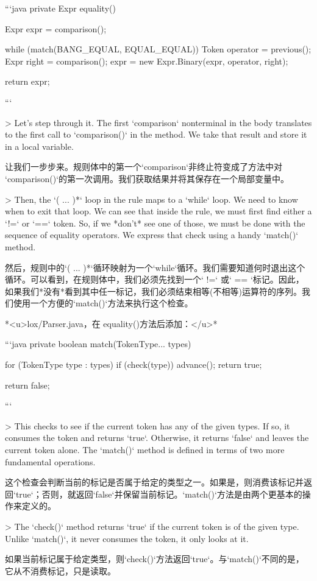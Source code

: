 \documentclass[cn,11pt,chinese]{elegantbook}
\begin{document}
```java
  private Expr equality() {
    Expr expr = comparison();

    while (match(BANG_EQUAL, EQUAL_EQUAL)) {
      Token operator = previous();
      Expr right = comparison();
      expr = new Expr.Binary(expr, operator, right);
    }

    return expr;
  }
```

> Let’s step through it. The first `comparison` nonterminal in the body translates to the first call to `comparison()` in the method. We take that result and store it in a local variable.

让我们一步步来。规则体中的第一个`comparison`非终止符变成了方法中对 `comparison()`的第一次调用。我们获取结果并将其保存在一个局部变量中。

> Then, the `( ... )*` loop in the rule maps to a `while` loop. We need to know when to exit that loop. We can see that inside the rule, we must first find either a `!=` or `==` token. So, if we *don’t* see one of those, we must be done with the sequence of equality operators. We express that check using a handy `match()` method.

然后，规则中的`( ... )*`循环映射为一个`while`循环。我们需要知道何时退出这个循环。可以看到，在规则体中，我们必须先找到一个` !=` 或` == `标记。因此，如果我们*没有*看到其中任一标记，我们必须结束相等(不相等)运算符的序列。我们使用一个方便的`match()`方法来执行这个检查。

*<u>lox/Parser.java，在 equality()方法后添加：</u>*

```java
  private boolean match(TokenType... types) {
    for (TokenType type : types) {
      if (check(type)) {
        advance();
        return true;
      }
    }

    return false;
  }
```

> This checks to see if the current token has any of the given types. If so, it consumes the token and returns `true`. Otherwise, it returns `false` and leaves the current token alone. The `match()` method is defined in terms of two more fundamental operations.

这个检查会判断当前的标记是否属于给定的类型之一。如果是，则消费该标记并返回`true`；否则，就返回`false`并保留当前标记。`match()`方法是由两个更基本的操作来定义的。

> The `check()` method returns `true` if the current token is of the given type. Unlike `match()`, it never consumes the token, it only looks at it.

如果当前标记属于给定类型，则`check()`方法返回`true`。与`match()`不同的是，它从不消费标记，只是读取。
\end{document}
